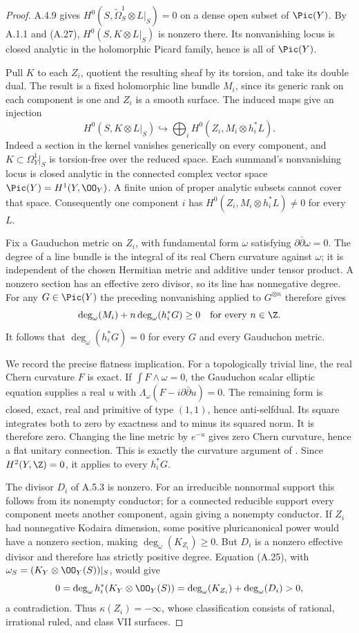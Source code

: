 \begin{proof}
A.4.9 gives $H^0(S,\widetilde\Omega_S^1\otimes L|_S)=0$ on a dense open subset of $\Pic(Y)$. By A.1.1 and (A.27), $H^0(S,K\otimes L|_S)$ is nonzero there. Its nonvanishing locus is closed analytic in the holomorphic Picard family, hence is all of $\Pic(Y)$.

Pull $K$ to each $Z_i$, quotient the resulting sheaf by its torsion, and take its double dual. The result is a fixed holomorphic line bundle $M_i$, since its generic rank on each component is one and $Z_i$ is a smooth surface. The induced maps give an injection
\[
 H^0(S,K\otimes L|_S)\hookrightarrow
       \bigoplus_i H^0(Z_i,M_i\otimes h_i^*L).
 \tag{A.29}
\]
Indeed a section in the kernel vanishes generically on every component, and $K\subset\Omega_Y^1|_S$ is torsion-free over the reduced space. Each summand's nonvanishing locus is closed analytic in the connected complex vector space $\Pic(Y)=H^1(Y,\OO_Y)$. A finite union of proper analytic subsets cannot cover that space. Consequently one component $i$ has
$H^0(Z_i,M_i\otimes h_i^*L)\ne0$ for every $L$.

Fix a Gauduchon metric on $Z_i$, with fundamental form $\omega$ satisfying $\partial\bar\partial\omega=0$. The degree of a line bundle is the integral of its real Chern curvature against $\omega$; it is independent of the chosen Hermitian metric and additive under tensor product. A nonzero section has an effective zero divisor, so its line has nonnegative degree. For any $G\in\Pic(Y)$ the preceding nonvanishing applied to $G^{\otimes n}$ therefore gives
\[
 \deg_\omega(M_i)+n\deg_\omega(h_i^*G)\ge0
 \quad\hbox{for every }n\in\Z.
\]
It follows that $\deg_\omega(h_i^*G)=0$ for every $G$ and every Gauduchon metric.

We record the precise flatness implication. For a topologically trivial line, the real Chern curvature $F$ is exact. If $\int F\wedge\omega=0$, the Gauduchon scalar elliptic equation supplies a real $u$ with $\Lambda_\omega(F-i\partial\bar\partial u)=0$. The remaining form is closed, exact, real and primitive of type $(1,1)$, hence anti-selfdual. Its square integrates both to zero by exactness and to minus its squared norm. It is therefore zero. Changing the line metric by $e^{-u}$ gives zero Chern curvature, hence a flat unitary connection. This is exactly the curvature argument of \cite[Lemma~2.3(1)--(2)]{Teleman2006}. Since $H^2(Y,\Z)=0$, it applies to every $h_i^*G$.

The divisor $D_i$ of A.5.3 is nonzero. For an irreducible nonnormal support this follows from its nonempty conductor; for a connected reducible support every component meets another component, again giving a nonempty conductor. If $Z_i$ had nonnegative Kodaira dimension, some positive pluricanonical power would have a nonzero section, making $\deg_\omega(K_{Z_i})\ge0$. But $D_i$ is a nonzero effective divisor and therefore has strictly positive degree. Equation (A.25), with $\omega_S=(K_Y\otimes\OO_Y(S))|_S$, would give
\[
 0=\deg_\omega h_i^*(K_Y\otimes\OO_Y(S))
   =\deg_\omega(K_{Z_i})+\deg_\omega(D_i)>0,
\]
a contradiction. Thus $\kappa(Z_i)=-\infty$, whose classification consists of rational, irrational ruled, and class VII surfaces.


\end{proof}
